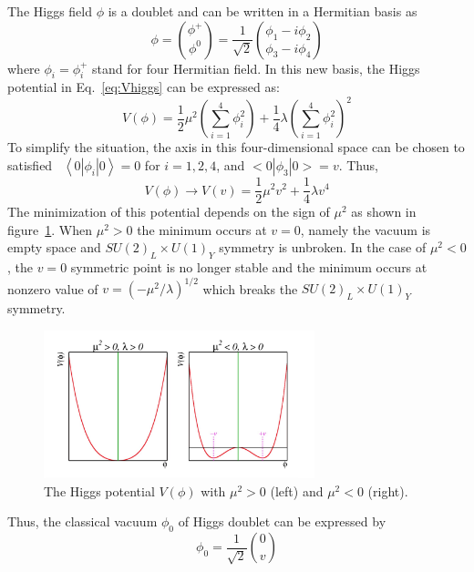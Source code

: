 The Higgs field $\phi$ is a doublet and can be written in a Hermitian basis as
\begin{equation}
	\phi = \binom{\phi^{+}}{\phi^{0}} = \frac{1}{\sqrt{2}} \binom{\phi_{1} - i\phi_{2}}{\phi_{3} - i\phi_{4}}
\end{equation}
where $\phi_{i} = \phi_{i}^{+}$ stand for four Hermitian field. 
In this new basis, the Higgs potential in Eq.~\ref{eq:Vhiggs} can be expressed as:
\begin{equation}
	V(\phi) = \frac{1}{2}\mu^{2}\left(\sum_{i=1}^{4}\phi_{i}^{2}\right) + \frac{1}{4}\lambda\left(\sum_{i=1}^{4}\phi_{i}^{2}\right)^{2}
\end{equation}
To simplify the situation, the axis in this four-dimensional space can be chosen to satisfied
~$\left<0\left| \phi_{i} \right|0\right> = 0$ for $i = 1, 2, 4$, and $<0\left| \phi_{3} \right|0> = v$. Thus,
\begin{equation}
	V(\phi) \rightarrow V(v) = \frac{1}{2}\mu^{2}v^{2} + \frac{1}{4}\lambda v^{4}
\end{equation}
The minimization of this potential depends on the sign of $\mu^{2}$ as shown in figure~\ref{fig:C2_Higgs_potential}.
When $\mu^{2} > 0$ the minimum occurs at $v = 0$, namely the vacuum is empty space and $SU(2)_{L} \times U(1)_{Y}$ symmetry is unbroken.
In the case of $\mu^{2} < 0$, the $v = 0$ symmetric point is no longer stable and the minimum occurs at nonzero value of 
$v = \left( -\mu^{2}/\lambda\right)^{1/2}$ which breaks the $SU(2)_{L} \times U(1)_{Y}$ symmetry.
\begin{figure}[!htb]
  \centering
  \includegraphics[width=0.7\textwidth]{figures/Theory/Vhiggs.png}
  \caption{The Higgs potential $V(\phi)$ with $\mu^{2}>0$ (left) and $\mu^{2}<0$ (right).}
  \label{fig:C2_Higgs_potential}
\end{figure}
Thus, the classical vacuum $\phi_{0}$ of Higgs doublet can be expressed by
\begin{equation}
	\phi_{0} = \frac{1}{\sqrt{2}}\binom{0}{v}
\end{equation}
